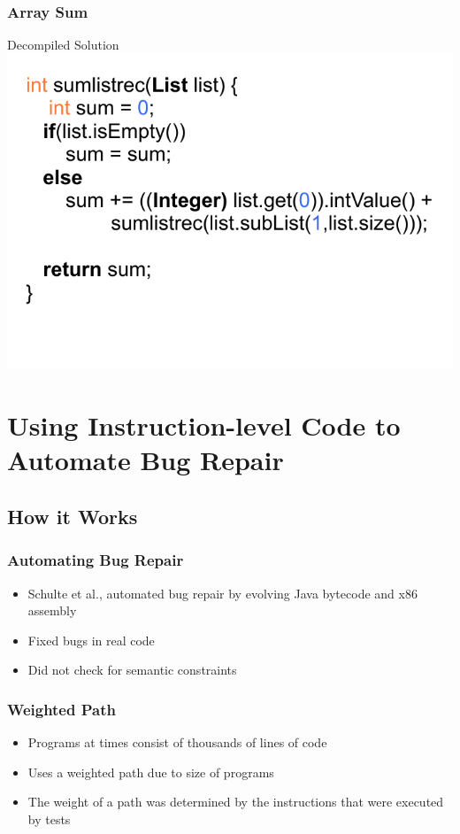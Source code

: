 \documentclass{beamer}
\begin{document}
\begin{frame}
\frametitle{Array Sum}
\begin{center}
Decompiled Solution
\\
\includegraphics[height=.9\textheight]{Illustrations/solutionRec.pdf}
\end{center}


\end{frame}


\section[Evolving Assembly]{Using Instruction-level Code to Automate Bug Repair}

\subsection{How it Works}
\begin{frame}
  \frametitle{Automating Bug Repair}
  \begin{itemize}
  \item Schulte et al., automated bug repair by evolving Java bytecode and x86 assembly
  \item Fixed bugs in real code
  \item Did not check for semantic constraints 
  \end{itemize}
\end{frame}

\begin{frame}
\frametitle{Weighted Path}
\begin{itemize}

   \item Programs at times consist of thousands of lines of code  
   \item Uses a weighted path due to size of programs
   \item The weight of a path was determined by the instructions that were executed by tests

   \end{itemize}
\end{frame}
\end{document}
